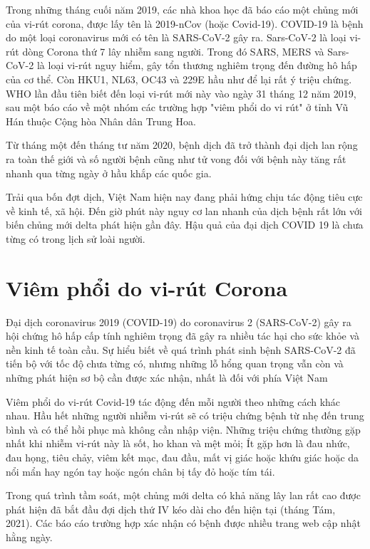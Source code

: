 \documentclass[../thesis.tex]{subfiles}
\begin{document}
Trong những tháng cuối năm 2019, các nhà khoa học đã báo cáo một chủng mới của vi-rút corona, được lấy tên là 2019-nCov (hoặc Covid-19). COVID-19 là bệnh do một loại coronavirus mới có tên là SARS-CoV-2  gây ra. Sars-CoV-2 là loại vi-rút dòng Corona thứ 7 lây nhiễm sang người. Trong đó SARS, MERS và Sars-CoV-2 là loại vi-rút nguy hiểm, gây tổn thương nghiêm trọng đến đường hô hấp của cơ thể. Còn HKU1, NL63, OC43 và 229E hầu như để lại rất ý triệu chứng. WHO lần đầu tiên biết đến loại vi-rút mới này vào ngày 31 tháng 12 năm 2019, sau một báo cáo về một nhóm các trường hợp "viêm phổi do vi rút" ở tỉnh Vũ Hán thuộc Cộng hòa Nhân dân Trung Hoa.

Từ tháng một đến tháng tư năm 2020, bệnh dịch đã trở thành đại dịch lan rộng ra toàn thế giới và số người bệnh cũng như tử vong đối với bệnh này tăng rất nhanh qua từng ngày ở hầu khắp các quốc gia. 

Trải qua bốn đợt dịch, Việt Nam hiện nay đang phải hứng chịu tác động tiêu cực về kinh tế, xã hội. Đến giờ phút này nguy cơ lan nhanh của dịch bệnh rất lớn với biến chủng mới delta phát hiện gần đây. Hậu quả của đại dịch COVID 19 là chưa từng có trong lịch sử loài người.

\section{Viêm phổi do vi-rút Corona}

Đại dịch coronavirus 2019 (COVID-19) do coronavirus 2 (SARS-CoV-2) gây ra hội chứng hô hấp cấp tính nghiêm trọng đã gây ra nhiều tác hại cho sức khỏe và nền kinh tế toàn cầu. Sự hiểu biết về quá trình phát sinh bệnh SARS-CoV-2 đã tiến bộ với tốc độ chưa từng có, nhưng những lỗ hổng quan trọng vẫn còn và những phát hiện sơ bộ cần được xác nhận, nhất là đối với phía Việt Nam

Viêm phổi do vi-rút Covid-19 tác động đến mỗi người theo những cách khác nhau. Hầu hết những người nhiễm vi-rút sẽ có triệu chứng bệnh từ nhẹ đến trung bình và có thể hồi phục mà không cần nhập viện. Những triệu chứng thường gặp nhất khi nhiễm vi-rút này là sốt, ho khan và mệt mỏi; Ít gặp hơn là đau nhức, đau họng, tiêu chảy, viêm kết mạc, đau đầu, mất vị giác hoặc khứu giác
hoặc da nổi mẩn hay ngón tay hoặc ngón chân bị tấy đỏ hoặc tím tái.

Trong quá trình tầm soát, một chủng mới delta có khả năng lây lan rất cao được phát hiện đã bắt đầu đợi dịch thứ IV kéo dài cho đến hiện tại (tháng Tám, 2021). Các báo cáo trường hợp xác nhận có bệnh được nhiều trang web cập nhật hằng ngày. 
\end{document}
